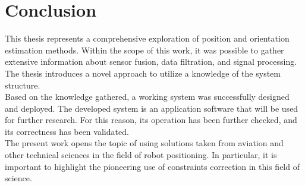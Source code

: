 \chapter{Conclusion}

This thesis represents a comprehensive exploration of position and orientation estimation methods. Within the scope of this work, it was possible to gather extensive information about sensor fusion, data filtration, and signal processing. The thesis introduces a novel approach to utilize a knowledge of the system structure.\\

Based on the knowledge gathered, a working system was successfully designed and deployed. The developed system is an application software that will be used for further research. For this reason, its operation has been further checked, and its correctness has been validated.\\

The present work opens the topic of using solutions taken from aviation and other technical sciences in the field of robot positioning. In particular, it is important to highlight the pioneering use of constraints correction in this field of science.




